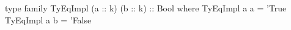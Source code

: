 \begin{code}
type family TyEqImpl (a :: k) (b :: k) :: Bool where
  TyEqImpl a a = 'True
  TyEqImpl a b = 'False
\end{code}
